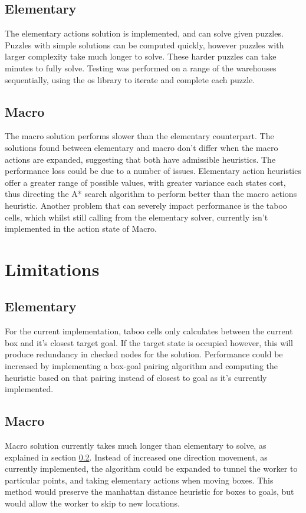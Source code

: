 \documentclass[]{article}
\begin{document}
\subsection{Elementary}
The elementary actions solution is implemented, and can solve given puzzles. Puzzles with simple solutions can be computed quickly, however puzzles with larger complexity take much longer to solve. These harder puzzles can take minutes to fully solve. Testing was performed on a range of the warehouses sequentially, using the os library to iterate and complete each puzzle. 
\subsection{Macro}
\label{Macro}
The macro solution performs slower than the elementary counterpart. The solutions found between elementary and macro don't differ when the macro actions are expanded, suggesting that both have admissible heuristics. The performance loss could be due to a number of issues. Elementary action heuristics offer a greater range of possible values, with greater variance each states cost, thus directing the A* search algorithm to perform better than the macro actions heuristic. Another problem that can severely impact performance is the taboo cells, which whilst still calling from the elementary solver, currently isn't implemented in the action state of Macro.
\section{Limitations}
\subsection{Elementary}
For the current implementation, taboo cells only calculates between the current box and it's closest target goal. If the target state is occupied however, this will produce redundancy in checked nodes for the solution. Performance could be increased by implementing a box-goal pairing algorithm and computing the heuristic based on that pairing instead of closest to goal as it's currently implemented.
\subsection{Macro}
Macro solution currently takes much longer than elementary to solve, as explained in section \ref{Macro}. Instead of increased one direction movement, as currently implemented, the algorithm could be expanded to tunnel the worker to particular points, and taking elementary actions when moving boxes. This method would preserve the manhattan distance heuristic for boxes to goals, but would allow the worker to skip to new locations. 
\end{document}
